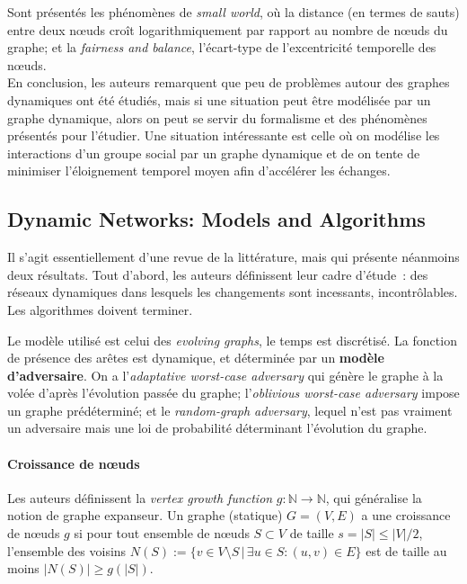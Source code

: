 \documentclass[12pt,a4paper]{article}
\begin{document}
Sont présentés les phénomènes de \textit{small world}, où la distance
(en termes de sauts) entre deux nœuds croît logarithmiquement par
rapport au nombre de nœuds du graphe; et la \textit{fairness and
  balance}, l'écart-type de l'excentricité temporelle des nœuds.\\

En conclusion, les auteurs remarquent que peu de problèmes autour des
graphes dynamiques ont été étudiés, mais si une situation peut être
modélisée par un graphe dynamique, alors on peut se servir du
formalisme et des phénomènes présentés pour l'étudier. Une situation
intéressante est celle où on modélise les interactions d'un groupe
social par un graphe dynamique et de on tente de minimiser
l'éloignement temporel moyen afin d'accélérer les échanges.

\subsection{Dynamic Networks: Models and
  Algorithms~\cite{DBLP:journals/sigact/KuhnO11}}

Il s'agit essentiellement d'une revue de la littérature, mais qui
présente néanmoins deux résultats. Tout d'abord, les auteurs
définissent leur cadre d'étude~: des réseaux dynamiques dans lesquels
les changements sont incessants, incontrôlables. Les algorithmes
doivent terminer.

Le modèle utilisé est celui des \textit{evolving graphs}, le temps est
discrétisé. La fonction de présence des arêtes est dynamique, et
déterminée par un \textbf{modèle d'adversaire}. On a
l'\textit{adaptative worst-case adversary} qui génère le graphe à la
volée d'après l'évolution passée du graphe; l'\textit{oblivious
  worst-case adversary} impose un graphe prédéterminé; et le
\textit{random-graph adversary}, lequel n'est pas vraiment un
adversaire mais une loi de probabilité déterminant l'évolution du
graphe.

\paragraph{Croissance de nœuds} Les auteurs définissent la
\textit{vertex growth function} \(g : \mathbb{N} \to \mathbb{N}\), qui
généralise la notion de graphe expanseur. Un graphe (statique)
\(G = (V, E)\) a une croissance de nœuds \(g\) si pour tout ensemble
de nœuds \(S \subset V\) de taille \(s = |S| \leq |V|/2\), l'ensemble
des voisins
\(N(S) := \{v \in V \setminus S \,|\, \exists u \in S : (u, v) \in
E\}\) est de taille au moins \(|N(S)| \geq g(|S|)\).
\end{document}
